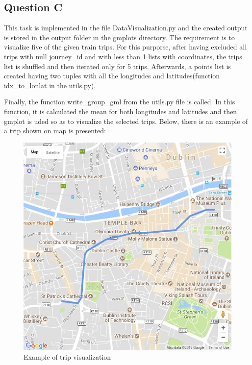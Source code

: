 \documentclass[12pt]{article}
\begin{document}
	\subsection{Question C}
	This task is implemented in the file DataVisualization.py and the created output is stored in the output folder in the gmplots directory. The requirement is to visualize five of the given train trips. For this purporse, after having excluded all trips with null journey\_id and with less than 1 lists with coordinates, the trips list is shuffled and then iterated only for 5 trips. Afterwards, a points list is created having two tuples with all the longitudes and latitudes(function idx\_to\_lonlat in the utils.py). 
	
	Finally, the function write\_group\_gml from the utils.py file is called. In this function, it is calculated the mean for both longitudes and latitudes and then gmplot is uded so as to visualize the selected trips. Below, there is an example of a trip shown on map is presented:
	
	\begin{figure} [H]
		\begin{center}
			\includegraphics [scale = 0.75] {questionCexample.jpg}
			\caption{Example of trip visualization}
		\end{center}
	\end{figure} 
	
\end{document}
